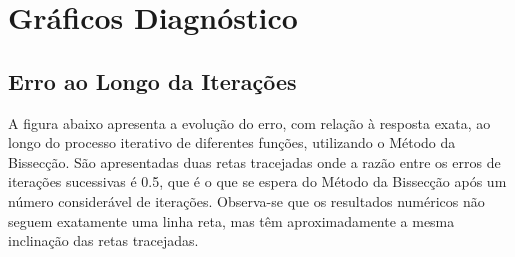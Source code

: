 \documentclass[final,3p,12pt]{elsarticle}
\begin{document}

 







\newpage

\appendix

\FloatBarrier
\section{Gráficos Diagnóstico}

\subsection{Erro ao Longo da Iterações}

A figura abaixo apresenta a evolução do erro, com relação à resposta exata, ao longo do processo iterativo de diferentes funções, utilizando o Método da Bissecção. São apresentadas duas retas tracejadas onde a razão entre os erros de iterações sucessivas é 0.5, que é o que se espera do Método da Bissecção após um número considerável de iterações. Observa-se que os resultados numéricos não seguem exatamente uma linha reta, mas têm aproximadamente a mesma inclinação das retas tracejadas.
\end{document}
